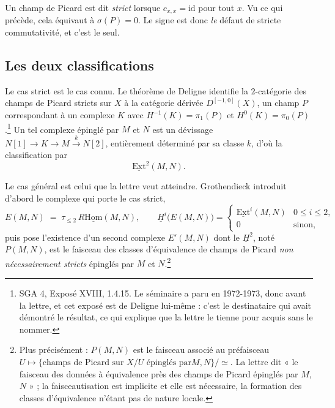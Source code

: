 \documentclass[11pt,a4paper]{article}
\begin{document}
Un champ de Picard est dit \emph{strict} lorsque $c_{x,x} = \mathrm{id}$ pour
tout $x$. Vu ce qui précède, cela équivaut à $\sigma(P) = 0$. Le signe est
donc \emph{le} défaut de stricte commutativité, et c'est le seul.

\subsection*{Les deux classifications}

Le cas strict est le cas connu. Le théorème de Deligne identifie la
$2$-catégorie des champs de Picard stricts sur $X$ à la catégorie dérivée
$D^{[-1,0]}(X)$, un champ $P$ correspondant à un complexe $K$ avec
$H^{-1}(K) = \pi_1(P)$ et $H^{0}(K) = \pi_0(P)$.\footnote{SGA 4, Exposé
XVIII, 1.4.15. Le séminaire a paru en 1972-1973, donc avant la lettre, et cet
exposé est de Deligne lui-même : c'est le destinataire qui avait démontré le
résultat, ce qui explique que la lettre le tienne pour acquis sans le nommer.} Un tel
complexe épinglé par $M$ et $N$ est un dévissage
$N[1] \to K \to M \xrightarrow{\,k\,} N[2]$, entièrement déterminé par sa
classe $k$, d'où la classification par
\[ \underline{\mathrm{Ext}}^2(M,N) . \]

Le cas général est celui que la lettre veut atteindre. Grothendieck introduit
d'abord le complexe qui porte le cas strict,
\[ E(M,N) \;=\; \tau_{\leq 2} \, R\underline{\mathrm{Hom}}(M,N) , \qquad
   \underline{H}^i\bigl(E(M,N)\bigr) =
   \begin{cases}
     \underline{\mathrm{Ext}}^i(M,N) & 0 \leq i \leq 2, \\
     0 & \text{sinon,}
   \end{cases} \]
puis pose l'existence d'un second complexe $E'(M,N)$ dont le
$\underline{H}^2$, noté $P(M,N)$, est le faisceau des classes d'équivalence de
champs de Picard \emph{non nécessairement stricts} épinglés par $M$ et
$N$.\footnote{Plus précisément : $P(M,N)$ est le faisceau associé au
préfaisceau $U \mapsto \{\text{champs de Picard sur } X/U \text{ épinglés par
} M, N\}/\!\simeq$. La lettre dit « le faisceau des données à équivalence près
des champs de Picard épinglés par $M$, $N$ » ; la faisceautisation est
implicite et elle est nécessaire, la formation des classes d'équivalence
n'étant pas de nature locale.}
\end{document}

